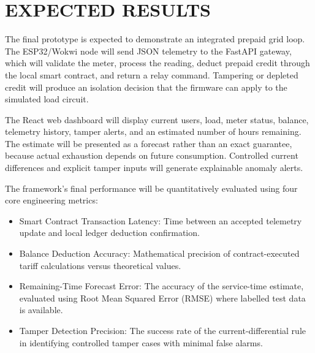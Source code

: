 \chapter{EXPECTED RESULTS}
The final prototype is expected to demonstrate an integrated prepaid grid loop. The ESP32/Wokwi node will send JSON telemetry to the FastAPI gateway, which will validate the meter, process the reading, deduct prepaid credit through the local smart contract, and return a relay command. Tampering or depleted credit will produce an isolation decision that the firmware can apply to the simulated load circuit.

The React web dashboard will display current users, load, meter status, balance, telemetry history, tamper alerts, and an estimated number of hours remaining. The estimate will be presented as a forecast rather than an exact guarantee, because actual exhaustion depends on future consumption. Controlled current differences and explicit tamper inputs will generate explainable anomaly alerts.

The framework's final performance will be quantitatively evaluated using four core engineering metrics:
\begin{itemize}

\item Smart Contract Transaction Latency: Time between an accepted telemetry update and local ledger deduction confirmation.

\item Balance Deduction Accuracy: Mathematical precision of contract-executed tariff calculations versus theoretical values.

\item Remaining-Time Forecast Error: The accuracy of the service-time estimate, evaluated using Root Mean Squared Error (RMSE) where labelled test data is available.

\item Tamper Detection Precision: The success rate of the current-differential rule in identifying controlled tamper cases with minimal false alarms.
\end{itemize}
